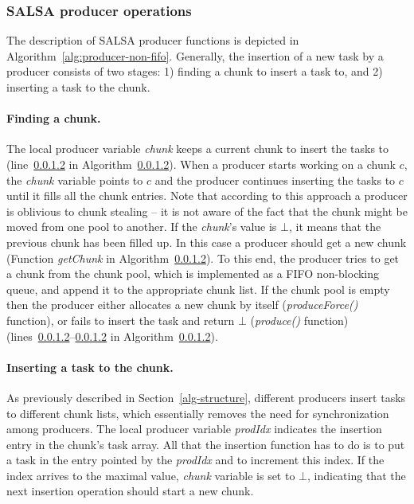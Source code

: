 \subsubsection {SALSA producer operations}

The description of SALSA producer functions is depicted in Algorithm~\ref{alg:producer-non-fifo}. 
Generally, the insertion of a new task by a producer consists of two stages: 
1) finding a chunk to insert a task to, and 2) inserting a task to the chunk. 

\paragraph {Finding a chunk.}
The local producer variable \emph{chunk} keeps a current chunk to insert the tasks to (line~\ref{} in Algorithm~\ref{}). 
When a producer starts working on a chunk $c$, the \emph{chunk} variable points to $c$ and the producer continues inserting the tasks to $c$ until it fills all the chunk entries. 
Note that according to this approach a producer is oblivious to chunk stealing -- it is not aware of the fact that the chunk might be moved from one pool to another.  
If the \emph{chunk}'s value is $\bot$, it means that the previous chunk has been filled up. In this case a producer should get a new chunk (Function \emph{getChunk} in Algorithm~\ref{}). 
To this end, the producer tries to get a chunk from the chunk pool, which is implemented as a FIFO non-blocking queue, and append it to the appropriate chunk list. If the chunk pool is empty then the producer either allocates a new chunk by itself (\emph{produceForce()} function), or fails to insert the task and return $\bot$ (\emph{produce()} function) (lines~\ref{}--\ref{} in Algorithm~\ref{}). 

\paragraph {Inserting a task to the chunk.}
As previously described in Section~\ref{alg-structure}, different producers insert tasks to different chunk lists, which essentially removes the need for synchronization among producers. 
The local producer variable \emph{prodIdx} indicates the insertion entry in the chunk's task array.
All that the insertion function has to do is to put a task in the entry pointed by the \emph{prodIdx} and to increment this index.
If the index arrives to the maximal value, \emph{chunk} variable is set to $\bot$, indicating that the next insertion operation should start a new chunk. 